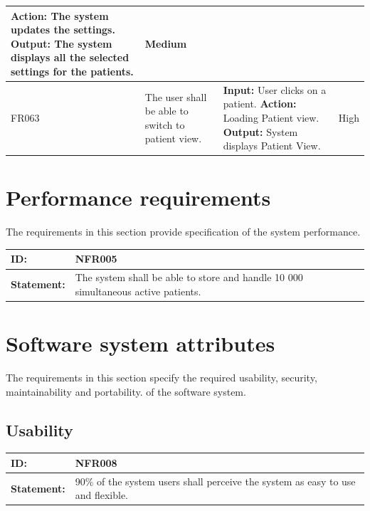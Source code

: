 \documentclass{scrreprt}
\begin{document}
\begin{center}
\begin{tabularx}{\linewidth}{| l | X | X | l |}
\newline \textbf{Action:} The system updates the settings.
\newline \textbf{Output:}  The system displays all the selected settings for the patients. & Medium \\ 
\hline
FR063 & The user shall be able to switch to patient view. & \textbf{Input:} User clicks on a patient.
\newline \textbf{Action:} Loading Patient view.
\newline \textbf{Output:} System displays Patient View. & High \\ 
\hline
\end{tabularx}
\end{center}

\section{Performance requirements}
The requirements in this section provide specification of the system performance. 

\begin{center}
\begin{tabularx}{\linewidth}{| l | X |}
 \hline
 \textbf{ID:} & NFR005  \\ 
 \hline
 \textbf{Statement:} & The system shall be able to store and handle 10 000 simultaneous active patients.
 \\ 
 \hline
\end{tabularx}
\end{center}


\section{Software system attributes}
The requirements in this section specify the required usability, security, maintainability and portability.
of the software system.

\subsection{Usability}
\begin{center}
\begin{tabularx}{\linewidth}{| l | X |}
 \hline
 \textbf{ID:} & NFR008  \\ 
 \hline
 \textbf{Statement:} & 90\% of the system users shall perceive the system as easy to use and flexible.
 \\ 
 \hline
\end{tabularx}
\end{center}
\end{document}
